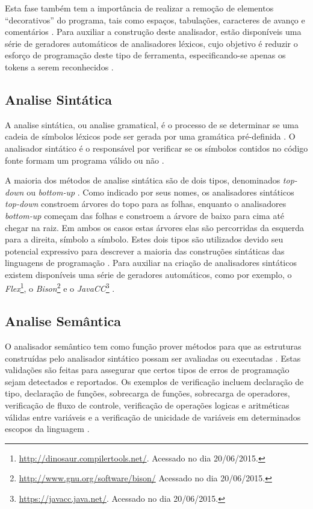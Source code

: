 Esta fase também tem a importância de realizar a remoção de elementos 
“decorativos” do programa, tais como espaços, tabulações, caracteres de 
avanço e comentários \cite{ref15}. Para auxiliar a construção deste analisador,
 estão disponíveis uma série de geradores automáticos de analisadores léxicos, 
cujo objetivo é reduzir o esforço de programação deste tipo de ferramenta, 
especificando-se apenas os tokens a serem reconhecidos \cite{ref18}.

\subsection{Analise Sintática}

A analise sintática, ou analise gramatical, é o processo de se determinar 
se uma cadeia de símbolos léxicos pode ser gerada por uma gramática pré-definida
 \cite{ref19}. O analisador sintático é o responsável por verificar se os 
símbolos contidos no código fonte formam um programa válido ou não \cite{ref20}.

A maioria dos métodos de analise sintática são de dois tipos, denominados 
\textit{top-down} ou \textit{bottom-up} \cite{ref21}. Como indicado por 
seus nomes, os analisadores sintáticos \textit{top-down} constroem árvores 
do topo para as folhas, enquanto o analisadores \textit{bottom-up} começam das 
folhas e constroem a árvore de baixo para cima até chegar na raiz. Em ambos os
 casos  estas árvores  elas são percorridas da esquerda para a direita, 
símbolo a símbolo. Estes dois tipos são utilizados devido seu potencial 
expressivo para descrever a maioria das construções sintáticas das linguagens 
de programação \cite{ref20}. Para auxiliar na criação de analisadores sintáticos 
existem disponíveis uma série de geradores automáticos, como por exemplo, 
o \textit{Flex}\footnote{\url{http://dinosaur.compilertools.net/}. Acessado no dia 20/06/2015.}, 
o \textit{Bison}\footnote{\url{http://www.gnu.org/software/bison/} Acessado no dia 20/06/2015.}
 e o \textit{JavaCC}\footnote{\url{https://javacc.java.net/}. Acessado no dia 20/06/2015.}
 \cite{ref22}.

\subsection{Analise Semântica}

O analisador semântico tem como função prover métodos para que as estruturas 
construídas pelo analisador sintático possam ser avaliadas ou executadas \cite{ref23}. 
Estas validações são feitas para assegurar que certos tipos de erros de 
programação sejam detectados e reportados. Os  exemplos de verificação incluem 
declaração de tipo, declaração de funções, sobrecarga de funções, sobrecarga de 
operadores, verificação de fluxo de controle, verificação de operações logicas e 
aritméticas válidas entre variáveis e a verificação de unicidade de variáveis em 
determinados escopos da linguagem \cite{ref24}.

